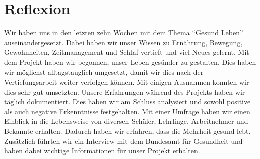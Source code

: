 \chapter{Reflexion}
\authortoc{\dario}{\chapterident}
Wir haben uns in den letzten zehn Wochen mit dem Thema “Gesund Leben” auseinandergesetzt. Dabei haben wir unser Wissen zu Ernährung, Bewegung, Gewohnheiten, Zeitmanagement und Schlaf vertieft und viel Neues gelernt.
\newline
Mit dem Projekt haben wir begonnen, unser Leben gesünder zu gestalten. Dies haben wir möglichst alltagstauglich umgesetzt, damit wir dies nach der Vertiefungsarbeit weiter verfolgen können. Mit einigen Ausnahmen konnten wir dies sehr gut umsetzten. Unsere Erfahrungen während des Projekts haben wir täglich dokumentiert. Dies haben wir am Schluss analysiert und sowohl positive als auch negative Erkenntnisse festgehalten.
\newline
Mit einer Umfrage haben wir einen Einblick in die Lebensweise von diversen Schüler, Lehrlinge, Arbeitnehmer und Bekannte erhalten. Dadurch haben wir erfahren, dass die Mehrheit gesund lebt. Zusätzlich führten wir ein Interview mit dem Bundesamt für Gesundheit und haben dabei wichtige Informationen für unser Projekt erhalten.